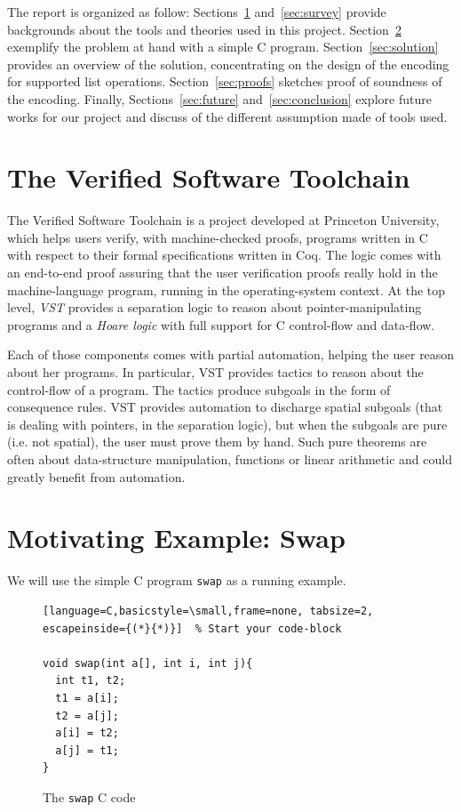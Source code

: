 \documentclass[onecolumn, preprint]{sigplanconf}
\begin{document}
The report is organized as follow: Sections~\ref{sec:VST} and~\ref{sec:survey} provide backgrounds about the tools and theories used in this project. Section~\ref{sec:motiv} exemplify the problem at hand with a simple C program. Section~\ref{sec:solution} provides an overview of the solution, concentrating on the design of the encoding for supported list operations. Section~\ref{sec:proofs} sketches proof of soundness of the encoding. Finally, Sections~\ref{sec:future} and~\ref{sec:conclusion} explore future works for our project and discuss of the different assumption made of tools used.

\section{The Verified Software Toolchain}
\label{sec:VST}

The Verified Software Toolchain is a project developed at Princeton University\cite{VST}, which helps users verify, with machine-checked proofs, programs written in C with respect to their formal specifications written in Coq. The logic comes with an end-to-end proof assuring that the user verification proofs really hold in the machine-language program, running in the operating-system context. At the top level, \emph{VST} provides a separation logic to reason about pointer-manipulating programs and a \emph{Hoare logic} with full support for C control-flow and data-flow. 

Each of those components comes with partial automation, helping the user reason about her programs. In particular, VST provides tactics to reason about the control-flow of a program. The tactics produce subgoals in the form of consequence rules. VST provides automation to discharge spatial subgoals (that is dealing with pointers, in the separation logic), but when the subgoals are pure (i.e. not spatial), the user must prove them by hand. Such pure theorems are often about data-structure manipulation, functions or linear arithmetic and could greatly benefit from automation.


\section{Motivating Example: Swap}
\label{sec:motiv}

We will use the simple C program \texttt{swap} as a running example.

\begin{figure}[ht]
\begin{lstlisting}[language=C,basicstyle=\small,frame=none, tabsize=2, escapeinside={(*}{*)}]  % Start your code-block

void swap(int a[], int i, int j){
  int t1, t2;
  t1 = a[i];
  t2 = a[j];
  a[i] = t2;
  a[j] = t1;
}
\end{lstlisting}
\caption{The \texttt{swap}  C code}
\label{fig:swap}
\end{figure}
\end{document}
